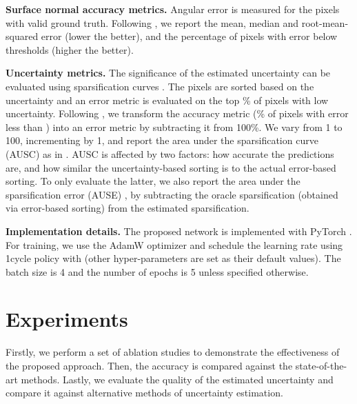 \documentclass[10pt,twocolumn,letterpaper]{article}
\begin{document}
\noindent
\textbf{Surface normal accuracy metrics.} Angular error is measured for the pixels with valid ground truth. Following \cite{SNfromRGB_13_3DP}, we report the mean, median and root-mean-squared error (lower the better), and the percentage of pixels with error below thresholds  (higher the better).

\noindent
\textbf{Uncertainty metrics.} The significance of the estimated uncertainty can be evaluated using sparsification curves \cite{on_the_uncertainty}. The pixels are sorted based on the uncertainty and an error metric  is evaluated on the top \% of pixels with low uncertainty. Following \cite{on_the_uncertainty}, we transform the accuracy metric (\% of pixels with error less than ) into an error metric by subtracting it from 100\%. We vary  from 1 to 100, incrementing by 1, and report the area under the sparsification curve (AUSC) as in \cite{ausc_defined}. AUSC is affected by two factors: how accurate the predictions are, and how similar the uncertainty-based sorting is to the actual error-based sorting. To only evaluate the latter, we also report the area under the sparsification error (AUSE) \cite{ause_defined}, by subtracting the oracle sparsification (obtained via error-based sorting) from the estimated sparsification. 

\noindent
\textbf{Implementation details.} The proposed network is implemented with PyTorch \cite{PyTorch}. For training, we use the AdamW optimizer \cite{AdamW_introduced} and schedule the learning rate using 1cycle policy \cite{1cycle-lr} with  (other hyper-parameters are set as their default values). The batch size is 4 and the number of epochs is 5 unless specified otherwise. 

\section{Experiments}

Firstly, we perform a set of ablation studies to demonstrate the effectiveness of the proposed approach. Then, the accuracy is compared against the state-of-the-art methods. Lastly, we evaluate the quality of the estimated uncertainty and compare it against alternative methods of uncertainty estimation.
\end{document}

